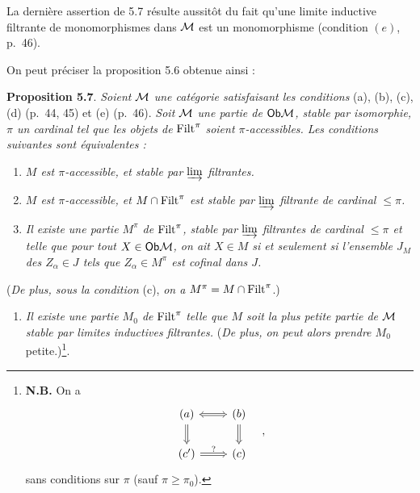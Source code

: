 
La dernière assertion de 5.7 résulte aussitôt du fait qu'une limite inductive filtrante de monomorphismes dans $\mathcal{M}$ est un monomorphisme (condition $(e)$, p.~46).

On peut préciser la proposition 5.6 obtenue ainsi :

\textbf{Proposition 5.7}. \textit{Soient $\mathcal{M}$ une catégorie satisfaisant les conditions} (a), (b), (c), (d) (p.~44, 45) et (e) (p.~46). \textit{Soit $\mathcal{M}$ une partie de} $\mathsf{Ob}\mathcal{M}$\textit{, stable par isomorphie, $\pi$ un cardinal tel que les objets de} $\mathrm{Filt}^\pi$ \textit{soient $\pi$-accessibles. Les conditions suivantes sont équivalentes :} %

\begin{enumerate}[label={}]
\item[a)] \textit{$M$ est $\pi$-accessible, et stable par $\varinjlim$ filtrantes.}
\item[b)] \textit{$M$ est $\pi$-accessible, et $M \cap \mathrm{Filt}^\pi$ est stable par $\varinjlim$ filtrante de cardinal $\leq \pi$.}
\item[c)] \textit{Il existe une partie $M^\pi$ de} $\mathrm{Filt}^\pi$\textit{, stable par $\varinjlim$ filtrantes de cardinal $\leq \pi$ et telle que pour tout $X \in \mathsf{Ob}\mathcal{M}$, on ait $X \in M$ si et seulement si l'ensemble $J_M$ des $Z_\alpha \in J$ tels que $Z_\alpha \in M^\pi$ est cofinal dans $J$.}
\end{enumerate}

(\textit{De plus, sous la condition} (c), \textit{on a}
$M^\pi = M \cap \mathrm{Filt}^\pi$.)
\begin{enumerate}[label={}]
\item[c$'$)] \textit{Il existe une partie $M_0$ de} $\mathrm{Filt}^\pi$ \textit{telle que $M$ soit la plus petite partie de $\mathcal{M}$ stable par limites inductives filtrantes.} (\textit{De plus, on peut alors prendre $M_0$} petite.)\footnote[22]{\textbf{N.B.} On a
\[
\begin{tikzcd}[ampersand replacement=\&]
(a) \arrow[r, Leftrightarrow] \arrow[d, Rightarrow] \& (b) \arrow[d, Rightarrow] \\
(c') \arrow[r, Rightarrow, "?"] \& (c)
\end{tikzcd}
\quad ,
\]
sans conditions sur $\pi$ (sauf $\pi \geq \pi_0$).}.
\end{enumerate}

